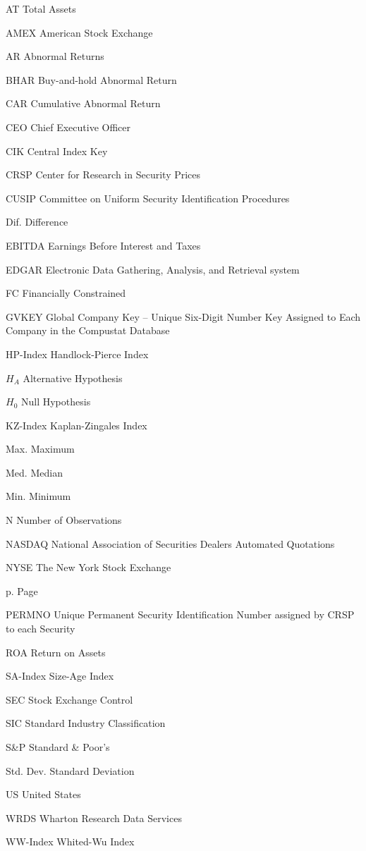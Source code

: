 \documentclass[12pt]{article}
\newcommand{\abbrlabel}[1]{\makebox[5cm][l]{#1\ \dotfill}}
\newenvironment{abbreviations}{\begin{list}{}{\renewcommand{\makelabel}{\abbrlabel}\setlength{\labelwidth}{5cm}\setlength{\leftmargin}{\labelwidth+\labelsep}%
\setlength{\itemsep}{0pt}}}{\end{list}}
\begin{document}
\begin{abbreviations}
	\item[AT] Total Assets
	\item[AMEX] American Stock Exchange
	\item[AR] Abnormal Returns
	\item[BHAR] Buy-and-hold Abnormal Return
	\item[CAR] Cumulative Abnormal Return
	\item[CEO] Chief Executive Officer
	\item[CIK] Central Index Key
	\item[CRSP] Center for Research in Security Prices
	\item[CUSIP] Committee on Uniform Security Identification Procedures
	\item[Dif.] Difference
	\item[EBITDA] Earnings Before Interest and Taxes
	\item[EDGAR] Electronic Data Gathering, Analysis, and Retrieval system
	\item[FC] Financially Constrained
	\item[GVKEY] Global Company Key -- Unique Six-Digit Number Key Assigned to Each Company in the Compustat Database
	\item[HP-Index] Handlock-Pierce Index
	\item[$H_{A}$] Alternative Hypothesis 
	\item[$H_{0}$] Null Hypothesis 
	\item[KZ-Index] Kaplan-Zingales Index
	\item[Max.] Maximum
	\item[Med.] Median
	\item[Min.] Minimum
	\item[N] Number of Observations
	\item[NASDAQ] National Association of Securities Dealers Automated Quotations
	\item[NYSE] The New York Stock Exchange
	\item[p.] Page
	\item[PERMNO] Unique Permanent Security Identification Number assigned by CRSP to each Security
	\item[ROA] Return on Assets
	\item[SA-Index] Size-Age Index
	\item[SEC] Stock Exchange Control 
	\item[SIC] Standard Industry Classification
	\item[S\&P] Standard \& Poor's
	\item[Std. Dev.] Standard Deviation
	\item[US] United States
	\item[WRDS] Wharton Research Data Services
	\item[WW-Index] Whited-Wu Index
\end{abbreviations}
\end{document}
